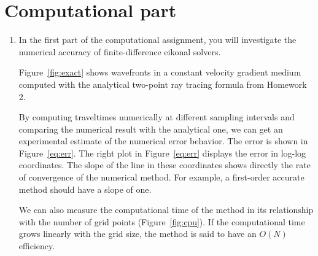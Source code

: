 \section{Computational part}

\begin{enumerate}

\item In the first part of the computational assignment, you will
  investigate the numerical accuracy of finite-difference eikonal solvers.

  
  Figure~\ref{fig:exact} shows wavefronts in a constant velocity
  gradient medium computed with the analytical two-point ray tracing
  formula from Homework 2.


  By computing traveltimes numerically at different sampling intervals
  and comparing the numerical result with the analytical one, we can
  get an experimental estimate of the numerical error behavior. The
  error is shown in Figure~\ref{eq:err}. The right plot in
  Figure~\ref{eq:err} displays the error in log-log coordinates. The
  slope of the line in these coordinates shows directly the rate of
  convergence of the numerical method. For example, a first-order
  accurate method should have a slope of one.


  We can also measure the computational time of the method in its
  relationship with the number of grid points (Figure~\ref{fig:cpu}).
  If the computational time grows linearly with the grid size, the
  method is said to have an $O(N)$ efficiency.



\end{enumerate}
